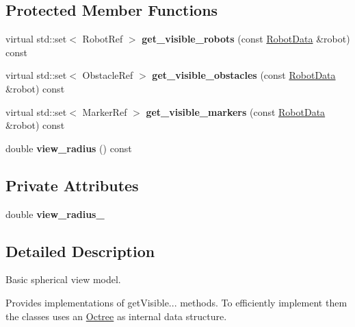 \subsection*{Protected Member Functions}
\begin{CompactItemize}
\item 
\hypertarget{class_spheric_view_432056355d892add503c2950df457209}{
virtual std::set$<$ RobotRef $>$ \textbf{get\_\-visible\_\-robots} (const \hyperlink{class_robot_data}{RobotData} \&robot) const }
\label{class_spheric_view_432056355d892add503c2950df457209}

\item 
\hypertarget{class_spheric_view_63302af51818598dd14b4a41f68424de}{
virtual std::set$<$ ObstacleRef $>$ \textbf{get\_\-visible\_\-obstacles} (const \hyperlink{class_robot_data}{RobotData} \&robot) const }
\label{class_spheric_view_63302af51818598dd14b4a41f68424de}

\item 
\hypertarget{class_spheric_view_daa935af0af47909afd7234f024ab1f2}{
virtual std::set$<$ MarkerRef $>$ \textbf{get\_\-visible\_\-markers} (const \hyperlink{class_robot_data}{RobotData} \&robot) const }
\label{class_spheric_view_daa935af0af47909afd7234f024ab1f2}

\item 
\hypertarget{class_spheric_view_83c5707136239b6c1c7af5fb2f320030}{
double \textbf{view\_\-radius} () const }
\label{class_spheric_view_83c5707136239b6c1c7af5fb2f320030}

\end{CompactItemize}
\subsection*{Private Attributes}
\begin{CompactItemize}
\item 
\hypertarget{class_spheric_view_5145c1290593cd597136d588dae1c060}{
double \textbf{view\_\-radius\_\-}}
\label{class_spheric_view_5145c1290593cd597136d588dae1c060}

\end{CompactItemize}


\subsection{Detailed Description}
Basic spherical view model. 

Provides implementations of getVisible... methods. To efficiently implement them the classes uses an \hyperlink{class_octree}{Octree} as internal data structure.


